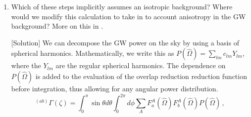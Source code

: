 \documentclass[article, onecolumn, ,nofootinbib,nopreprintnumbers]{revtex4}
\begin{document}
\begin{enumerate}
\item Which of these steps implicitly assumes an isotropic background? Where would we modify this calculation to take in to account anisotropy in the GW background? More on this in \cite{MingarelliEtAl:2013}.


[Solution] We can decompose the GW power on the sky by using a basis of spherical harmonics. Mathematically, we write this as $P(\hat\Omega)=\sum_{lm}c_{lm}Y_{lm}$, where the $Y_{lm}$ are the regular spherical harmonics. The dependence on $P(\hat\Omega)$ is added to the evaluation of the overlap reduction reduction function before integration, thus allowing for any angular power distribution.
\begin{equation}
^{(ab)}\Gamma(\zeta)=\int_0^\pi  \sin\theta d\theta \int_0^{2\pi} d\phi  \sum_A F^A_a(\hat \Omega) F^A_b(\hat \Omega) P(\hat\Omega)\, ,
\end{equation}
\end{enumerate}


\end{document}
